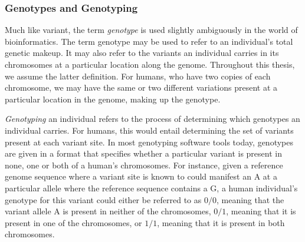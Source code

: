 \subsubsection{Genotypes and Genotyping} \label{background:biology:genotype_and_genotyping}
Much like variant, the term \textit{genotype} is used slightly ambiguously in the world of bioinformatics. 
The term genotype may be used to refer to an individual's total genetic makeup.
It may also refer to the variants an individual carries in its chromosomes at a particular location along the genome.
Throughout this thesis, we assume the latter definition.
For humans, who have two copies of each chromosome, we may have the same or two different variations present at a particular location in the genome, making up the genotype.

\textit{Genotyping} an individual refers to the process of determining which genotypes an individual carries. 
For humans, this would entail determining the set of variants present at each variant site.
In most genotyping software tools today, genotypes are given in a format that specifies whether a particular variant is present in none, one or both of a human's chromosomes.
For instance, given a reference genome sequence where a variant site is known to could manifest an A at a particular allele where the reference sequence contains a G, a human individual's genotype for this variant could either be referred to as $0/0$, meaning that the variant allele A is present in neither of the chromosomes, $0/1$, meaning that it is present in one of the chromosomes, or $1/1$, meaning that it is present in both chromosomes.


